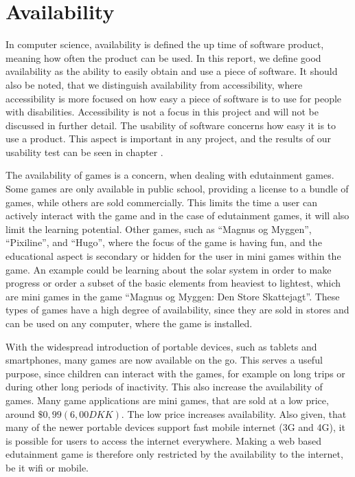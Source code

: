 \section{Availability}
\label{sec:availability}

In computer science, availability is defined the up time of software product, meaning how often the product can be used. \cite{defAvailability} In this report, we define good availability as the ability to easily obtain and use a piece of software. It should also be noted, that we distinguish availability from accessibility, where accessibility is more focused on how easy a piece of software is to use for people with disabilities. Accessibility is not a focus in this project and will not be discussed in further detail.  The usability of software concerns how easy it is to use a product.\cite{defUsability} This aspect is important in any project, and the results of our usability test can be seen in chapter .\newline

The availability of games is a concern, when dealing with edutainment games. Some games are only available in public school, providing a license to a bundle of games, while others are sold commercially. This limits the time a user can actively interact with the game and in the case of edutainment games, it will also limit the learning potential. Other games, such as ``Magnus og Myggen'', ``Pixiline'', and ``Hugo'', where the focus of the game is having fun, and the educational aspect is secondary or hidden for the user in mini games within the game. An example could be learning about the solar system in order to make progress or order a subset of the basic elements from heaviest to lightest, which are mini games in the game ``Magnus og Myggen: Den Store Skattejagt''. These types of games have a high degree of availability, since they are sold in stores and can be used on any computer, where the game is installed.\newline

With the widespread introduction of portable devices, such as tablets and smartphones, many games are now available on the go. This serves a useful purpose, since children can interact with the games, for example on long trips or during other long periods of inactivity. This also increase the availability of games. Many game applications are mini games, that are sold at a low price, around $\$0,99 (6,00 DKK)$. The low price increases availability. Also given, that many of the newer portable devices support fast mobile internet (3G and 4G), it is possible for users to access the internet everywhere. Making a web based edutainment game is therefore only restricted by the availability to the internet, be it wifi or mobile.\newline

